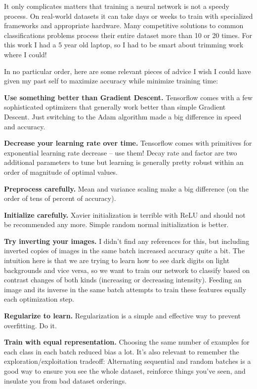 \documentclass{article}
\begin{document}
It only complicates matters that training a neural network is not a speedy process. On real-world datasets it can take days or weeks to train with specialized frameworks and appropriate hardware. Many competitive solutions to common classifications problems process their entire dataset more than 10 or 20 times. For this work I had a 5 year old laptop, so I had to be smart about trimming work where I could!

In no particular order, here are some relevant pieces of advice I wish I could have given my past self to maximize accuracy while minimize training time:

\textbf{Use something better than Gradient Descent.} Tensorflow comes with a few sophisticated optimizers that generally work better than simple Gradient Descent. Just switching to the Adam algorithm made a big difference in speed and accuracy.

\textbf{Decrease your learning rate over time.} Tensorflow comes with primitives for exponential learning rate decrease -- use them! Decay rate and factor are two additional parameters to tune but learning is generally pretty robust within an order of magnitude of optimal values.

\textbf{Preprocess carefully.} Mean and variance scaling make a big difference (on the order of tens of percent of accuracy).

\textbf{Initialize carefully.} Xavier initialization is terrible with ReLU and should not be recommended any more. Simple random normal initialization is better.

\textbf{Try inverting your images.} I didn't find any references for this, but including inverted copies of images in the same batch increased accuracy quite a bit. The intuition here is that we are trying to learn how to see dark digits on light backgrounds and vice versa, so we want to train our network to classify based on contrast changes of both kinds (increasing or decreasing intensity). Feeding an image and its inverse in the same batch attempts to train these features equally each optimization step.

\textbf{Regularize to learn.} Regularization is a simple and effective way to prevent overfitting. Do it.

\textbf{Train with equal representation.} Choosing the same number of examples for each class in each batch reduced bias a lot.  It's also relevant to remember the exploration/exploitation tradeoff: Alternating sequential and random batches is a good way to ensure you see the whole dataset, reinforce things you've seen, and insulate you from bad dataset orderings.
\end{document}
